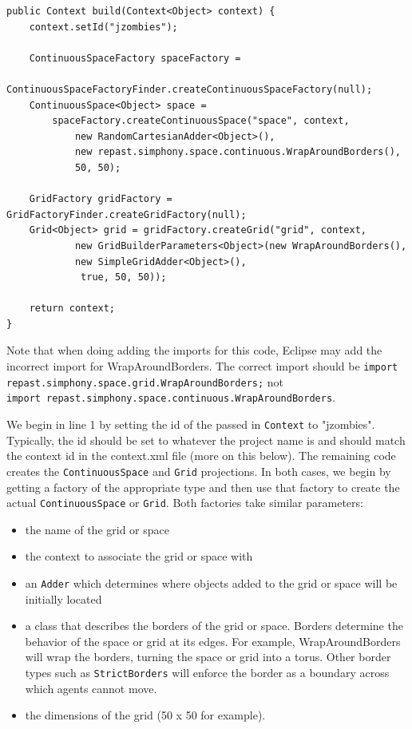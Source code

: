 \documentclass[11pt]{amsart}
\begin{document}
\noindent\begin{minipage}[h]{\textwidth}
\vspace{.2in}
\lstset{language=java,caption=JZombiesBuilder.build 1}
\begin{lstlisting}
public Context build(Context<Object> context) {
	context.setId("jzombies");
	
	ContinuousSpaceFactory spaceFactory = 
		ContinuousSpaceFactoryFinder.createContinuousSpaceFactory(null);
	ContinuousSpace<Object> space = 
		spaceFactory.createContinuousSpace("space", context, 
			new RandomCartesianAdder<Object>(),  
			new repast.simphony.space.continuous.WrapAroundBorders(), 
			50, 50);
	
	GridFactory gridFactory = GridFactoryFinder.createGridFactory(null);
	Grid<Object> grid = gridFactory.createGrid("grid", context,
	        new GridBuilderParameters<Object>(new WrapAroundBorders(), 
	        new SimpleGridAdder<Object>(),
	         true, 50, 50));
	         
	return context;
}		    
\end{lstlisting}
\vspace{.2in}
\end{minipage}

Note that when doing adding the imports for this code, Eclipse may add the incorrect import for WrapAroundBorders. The correct import should be \newline \texttt{import repast.simphony.space.grid.WrapAroundBorders;} not \\ \texttt{import repast.simphony.space.continuous.WrapAroundBorders}.

We begin in line 1 by setting the id of the passed in \texttt{Context} to "jzombies". Typically, the id should be set to whatever the project name is and should match the context id in the context.xml file (more on this below). The remaining code creates the \texttt{ContinuousSpace} and \texttt{Grid} projections. In both cases, we begin by getting a factory of the appropriate type and then use that factory to create the actual  \texttt{ContinuousSpace} or \texttt{Grid}. Both factories take similar parameters:

\begin{itemize}
\item the name of the grid or space
\item the context to associate the grid or space with
\item an \texttt{Adder} which determines where objects added to the grid or space will be initially located
\item a class that describes the borders of the grid or space. Borders determine the behavior of the space or grid at its edges. For example, WrapAroundBorders will wrap the borders, turning the space or grid into a torus. Other border types such as \texttt{StrictBorders} will enforce the border as a boundary across which agents cannot move.
\item the dimensions of the grid (50 x 50 for example).
\end{itemize}
\end{document}
